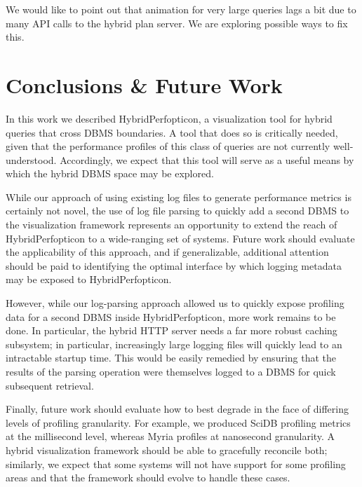 \documentclass{chi2009}
\begin{document}
We would like to point out that animation for very large queries lags a bit due to many API calls to the hybrid plan server. We are exploring possible ways to fix this. 

\section{Conclusions \& Future Work}

In this work we described HybridPerfopticon, a visualization tool for hybrid queries that cross DBMS boundaries.  A tool that does so is critically needed, given that the performance profiles of this class of queries are not currently well-understood.  Accordingly, we expect that this tool will serve as a useful means by which the hybrid DBMS space may be explored.

While our approach of using existing log files to generate performance metrics is certainly not novel, the use of log file parsing to quickly add a second DBMS to the visualization framework represents an opportunity to extend the reach of HybridPerfopticon to a wide-ranging set of systems.  Future work should evaluate the applicability of this approach, and if generalizable, additional attention should be paid to identifying the optimal interface by which logging metadata may be exposed to HybridPerfopticon.

However, while our log-parsing approach allowed us to quickly expose profiling data for a second DBMS inside HybridPerfopticon, more work remains to be done.  In particular, the hybrid HTTP server needs a far more robust caching subsystem; in particular, increasingly large logging files will quickly lead to an intractable startup time.  This would be easily remedied by ensuring that the results of the parsing operation were themselves logged to a DBMS for quick subsequent retrieval.

Finally, future work should evaluate how to best degrade in the face of differing levels of profiling granularity.  For example, we produced SciDB profiling metrics at the millisecond level, whereas Myria profiles at nanosecond granularity.  A hybrid visualization framework should be able to gracefully reconcile both; similarly, we expect that some systems will not have support for some profiling areas and that the framework should evolve to handle these cases.



\end{document}

